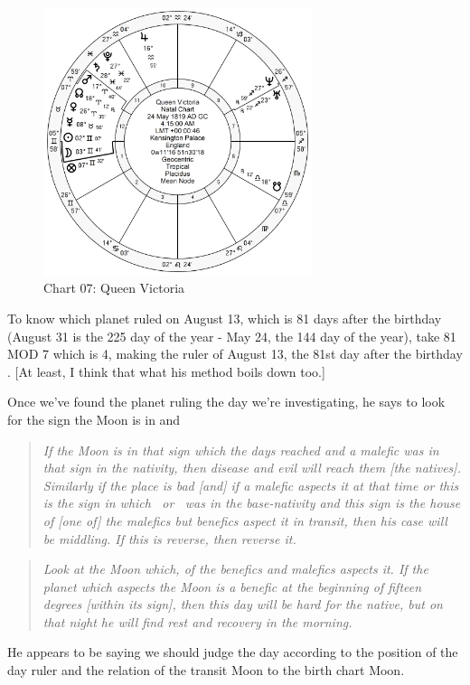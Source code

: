 \begin{figure}[H]
\centering
\includegraphics[width=0.7\textwidth]{charts/Victoria.png}
\caption{Chart 07: Queen Victoria}
\end{figure}

To know which planet ruled on August 13, which is 81 days after the birthday (August 31 is the 225 day of the year - May 24, the 144 day of the year), take 81 MOD 7 which is 4, making the ruler of August 13, the 81st day after the birthday \Jupiter. [At least, I think that what his method boils down too.]

Once we've found the planet ruling the day we're investigating, he says to look for the sign the Moon is in and
\begin{quote}
\textsl{If the Moon is in that sign which the days reached and a malefic was in that sign in the nativity, then disease and evil will reach them [the natives]. Similarly if the place is bad [and] if a malefic aspects it at that time or this is the sign in which \Saturn\, or \Mars\, was in the base-nativity and this sign is the house of [one of] the malefics but benefics aspect it in transit, then his case will be middling. If this is reverse, then reverse it.}
\end{quote} 
\begin{quote}
\textsl{Look at the Moon which, of the benefics and malefics aspects it. If the planet which aspects the Moon is a benefic at the beginning of fifteen degrees [within its sign], then this day will be hard for the native, but on that night he will find rest and recovery in the morning.
}
\end{quote}

He appears to be saying we should judge the day according to the position of the day ruler and the relation of the transit Moon to the birth chart Moon. 